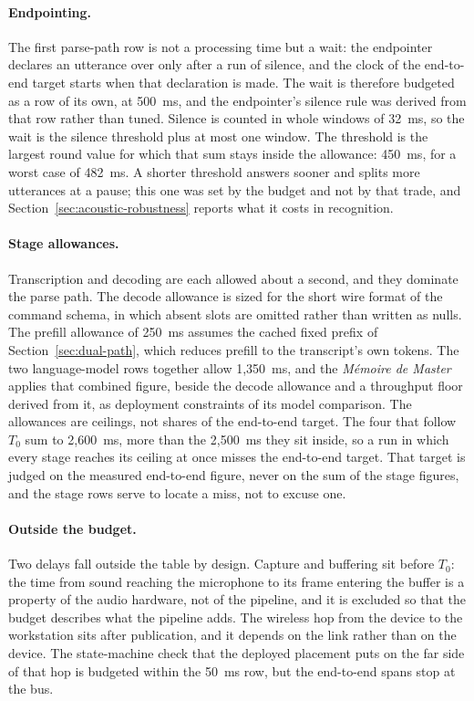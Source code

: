 \paragraph{Endpointing.} The first parse-path row is not a processing time but a wait: the
endpointer declares an utterance over only after a run of silence, and the clock of the
end-to-end target starts when that declaration is made. The wait is therefore budgeted as a row of
its own, at 500~ms, and the endpointer's silence rule was derived from that row rather than tuned.
Silence is counted in whole windows of 32~ms, so the wait is the silence threshold plus at most one
window. The threshold is the largest round value for which that sum stays inside the allowance:
450~ms, for a worst case of 482~ms. A shorter threshold answers sooner and splits more utterances
at a pause; this one was set by the budget and not by that trade, and
Section~\ref{sec:acoustic-robustness} reports what it costs in recognition.

\paragraph{Stage allowances.} Transcription and decoding are each allowed about a second, and they
dominate the parse path. The decode allowance is sized for the short wire format of the command
schema, in which absent slots are omitted rather than written as nulls. The prefill allowance of
250~ms assumes the cached fixed prefix of Section~\ref{sec:dual-path}, which reduces prefill to the
transcript's own tokens. The two language-model rows together allow 1{,}350~ms, and the
\emph{M\'emoire de Master} applies that combined figure, beside the decode allowance and a
throughput floor derived from it, as deployment constraints of its model
comparison. The allowances are ceilings, not shares of the end-to-end target. The four that follow
$T_0$ sum to 2{,}600~ms, more than the 2{,}500~ms they sit inside, so a run in which every stage
reaches its ceiling at once misses the end-to-end target. That target is judged on the measured
end-to-end figure, never on the sum of the stage figures, and the stage rows serve to locate a
miss, not to excuse one.

\paragraph{Outside the budget.} Two delays fall outside the table by design. Capture and buffering
sit before $T_0$: the time from sound reaching the microphone to its frame entering the buffer is a
property of the audio hardware, not of the pipeline, and it is excluded so that the budget
describes what the pipeline adds. The wireless hop from the device to the workstation sits after
publication, and it depends on the link rather than on the device. The state-machine check that
the deployed placement puts on the far side of that hop is budgeted within the 50~ms row, but
the end-to-end spans stop at the bus.

